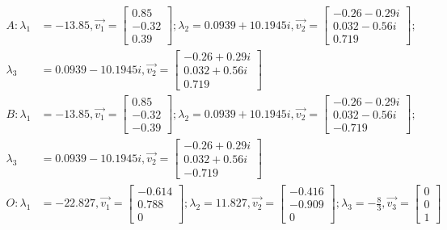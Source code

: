 \documentclass[12pt, a4paper]{article}
\theoremstyle{definition}
\begin{document}
\begin{align*}
    A: \lambda_1 &= -13.85, \Vec{v_1} = \left[ \begin{array}{cc}0.85 \\ -0.32 \\ 0.39\end{array} \right]; \lambda_2 = 0.0939 + 10.1945i, \Vec{v_2} = \left[ \begin{array}{c} -0.26-0.29i \\ 0.032-0.56i \\ 0.719 \end{array} \right];\\
    \lambda_3 &= 0.0939 - 10.1945i, \Vec{v_2} = \left[ \begin{array}{c} -0.26+0.29i \\ 0.032+0.56i \\ 0.719 \end{array} \right]\\
    B: \lambda_1 &= -13.85, \Vec{v_1} = \left[ \begin{array}{cc}0.85 \\ -0.32 \\ -0.39\end{array} \right]; \lambda_2 = 0.0939 + 10.1945i, \Vec{v_2} = \left[ \begin{array}{c} -0.26-0.29i \\ 0.032-0.56i \\ -0.719 \end{array} \right];\\
    \lambda_3 &= 0.0939 - 10.1945i, \Vec{v_2} = \left[ \begin{array}{c} -0.26+0.29i \\ 0.032+0.56i \\ -0.719 \end{array} \right]\\
    O: \lambda_1 &= -22.827, \Vec{v_1} = \left[\begin{array}{c} -0.614\\  0.788\\ 0\end{array} \right]; \lambda_2 = 11.827, \Vec{v_2} = \left[ \begin{array}{c} -0.416\\-0.909\\0\end{array}\right];
    \lambda_3 = -\frac{8}{3}, \Vec{v_3} = \left[ \begin{array}{c}0\\0\\1\end{array} \right]
\end{align*}
\end{document}
